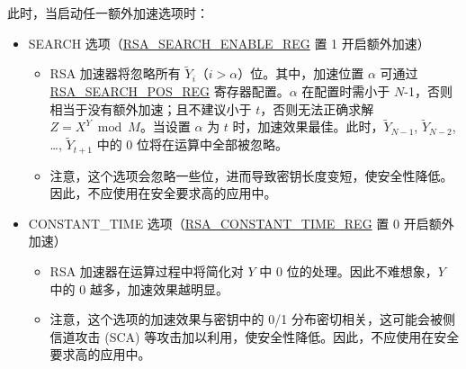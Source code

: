 \documentclass[main\_\_CN.tex]{subfiles}
\begin{document}
此时，当启动任一额外加速选项时：
\begin{itemize}
\item SEARCH 选项（\hyperref[regdesc:RSASEARCHENABLEREG]{RSA\_SEARCH\_ENABLE\_REG} 置 1 开启额外加速）
    \begin{itemize}
        \item RSA 加速器将忽略所有 \begin{math} \widetilde{Y}_{i} \end{math}（\begin{math} i > \alpha \end{math}）位。其中，加速位置 \begin{math} \alpha \end{math} 可通过 \hyperref[regdesc:RSASEARCHPOSREG]{RSA\_SEARCH\_POS\_REG} 寄存器配置。\begin{math} \alpha \end{math} 在配置时需小于 \begin{math}N\end{math}-1，否则相当于没有额外加速；且不建议小于 \begin{math} t \end{math}，否则无法正确求解 \begin{math}Z = X^{Y} \bmod M \end{math}。当设置 \begin{math} \alpha \end{math} 为 \begin{math} t \end{math} 时，加速效果最佳。此时，\begin{math}\widetilde{Y}_{N-1}\end{math}, \begin{math}\widetilde{Y}_{N-2}\end{math}, \dots, \begin{math}\widetilde{Y}_{t+1}\end{math} 中的 0 位将在运算中全部被忽略。
        \item 注意，这个选项会忽略一些位，进而导致密钥长度变短，使安全性降低。因此，不应使用在安全要求高的应用中。
    \end{itemize}  
\item CONSTANT\_TIME 选项（\hyperref[regdesc:RSACONSTANTTIMEREG]{RSA\_CONSTANT\_TIME\_REG} 置 0 开启额外加速）
    \begin{itemize}
        \item RSA 加速器在运算过程中将简化对 \begin{math} Y \end{math} 中 0 位的处理。因此不难想象，\begin{math} Y \end{math} 中的 0 越多，加速效果越明显。
        \item 注意，这个选项的加速效果与密钥中的 0/1 分布密切相关，这可能会被侧信道攻击 (SCA) 等攻击加以利用，使安全性降低。因此，不应使用在安全要求高的应用中。
    \end{itemize}
\end{itemize}
\end{document}
